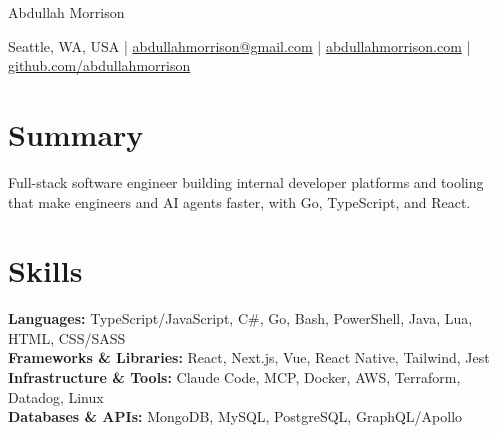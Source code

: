 \documentclass[letterpaper]{article}
\begin{document}
\centerline{\Huge Abdullah Morrison}

\vspace{5pt}

\centerline{\faMapMarker \hspace{0.5mm} Seattle, WA, USA |  \href{mailto:abdullahmorrison@gmail.com}{\faEnvelope \hspace{0.5mm} abdullahmorrison@gmail.com} |  \href{https://abdullahmorrison.com}{\faGlobe \hspace{0.5mm} abdullahmorrison.com} |  \href{https://github.com/abdullahmorrison}{\faGithub \hspace{0.5mm } github.com/abdullahmorrison}}

\vspace{-10pt}
\section{Summary}
Full-stack software engineer building internal developer platforms and tooling that make engineers and AI agents faster, with Go, TypeScript, and React.

\vspace{-10pt}
\section{Skills}
\textbf{Languages:} TypeScript/JavaScript, C\#, Go, Bash, PowerShell, Java, Lua, HTML, CSS/SASS \\
\textbf{Frameworks \& Libraries:} React, Next.js, Vue, React Native, Tailwind, Jest\\
\textbf{Infrastructure \& Tools:} Claude Code, MCP, Docker, AWS, Terraform, Datadog, Linux \\
\textbf{Databases \& APIs:} MongoDB, MySQL, PostgreSQL, GraphQL/Apollo

\vspace{-6.5pt}
\end{document}
